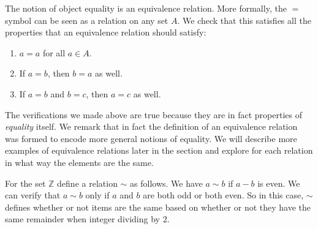 \begin{example}
The notion of object equality is an equivalence relation. More formally, the $=$ symbol can be seen as a relation on any set $A$. We check that this satisfies all the properties that an equivalence relation should satisfy:
\begin{enumerate}
	\item $a = a$ for all $a \in A$.
	\item If $a = b$, then $b = a$ as well.
	\item If $a = b$ and $b = c$, then $a = c$ as well.
\end{enumerate}
\end{example}
The verifications we made above are true because they are in fact properties of \textit{equality} itself. We remark that in fact the definition of an equivalence relation was formed to encode more general notions of equality. We will describe more examples of equivalence relations later in the section and explore for each relation in what way the elements are the same. 

\begin{example}
For the set $\mathbb{Z}$ define a relation $\sim$ as follows. We have $a \sim b$ if $a - b$ is even. We can verify that $a \sim b$ only if $a$ and $b$ are both odd or both even. So in this case, $\sim$ defines whether or not items are the same based on whether or not they have the same remainder when integer dividing by $2$.
\end{example}